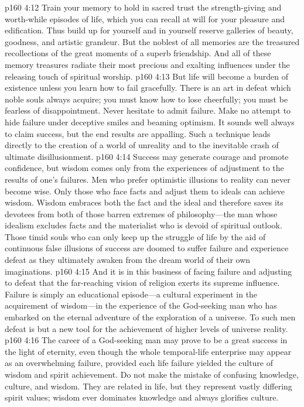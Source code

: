 \vs p160 4:12 Train your memory to hold in sacred trust the strength\hyp{}giving and worth\hyp{}while episodes of life, which you can recall at will for your pleasure and edification. Thus build up for yourself and in yourself reserve galleries of beauty, goodness, and artistic grandeur. But the noblest of all memories are the treasured recollections of the great moments of a superb friendship. And all of these memory treasures radiate their most precious and exalting influences under the releasing touch of spiritual worship.
\vs p160 4:13 But life will become a burden of existence unless you learn how to fail gracefully. There is an art in defeat which noble souls always acquire; you must know how to lose cheerfully; you must be fearless of disappointment. Never hesitate to admit failure. Make no attempt to hide failure under deceptive smiles and beaming optimism. It sounds well always to claim success, but the end results are appalling. Such a technique leads directly to the creation of a world of unreality and to the inevitable crash of ultimate disillusionment.
\vs p160 4:14 Success may generate courage and promote confidence, but wisdom comes only from the experiences of adjustment to the results of one’s failures. Men who prefer optimistic illusions to reality can never become wise. Only those who face facts and adjust them to ideals can achieve wisdom. Wisdom embraces both the fact and the ideal and therefore saves its devotees from both of those barren extremes of philosophy---the man whose idealism excludes facts and the materialist who is devoid of spiritual outlook. Those timid souls who can only keep up the struggle of life by the aid of continuous false illusions of success are doomed to suffer failure and experience defeat as they ultimately awaken from the dream world of their own imaginations.
\vs p160 4:15 And it is in this business of facing failure and adjusting to defeat that the far\hyp{}reaching vision of religion exerts its supreme influence. Failure is simply an educational episode---a cultural experiment in the acquirement of wisdom---in the experience of the God\hyp{}seeking man who has embarked on the eternal adventure of the exploration of a universe. To such men defeat is but a new tool for the achievement of higher levels of universe reality.
\vs p160 4:16 The career of a God\hyp{}seeking man may prove to be a great success in the light of eternity, even though the whole temporal\hyp{}life enterprise may appear as an overwhelming failure, provided each life failure yielded the culture of wisdom and spirit achievement. Do not make the mistake of confusing knowledge, culture, and wisdom. They are related in life, but they represent vastly differing spirit values; wisdom ever dominates knowledge and always glorifies culture.
